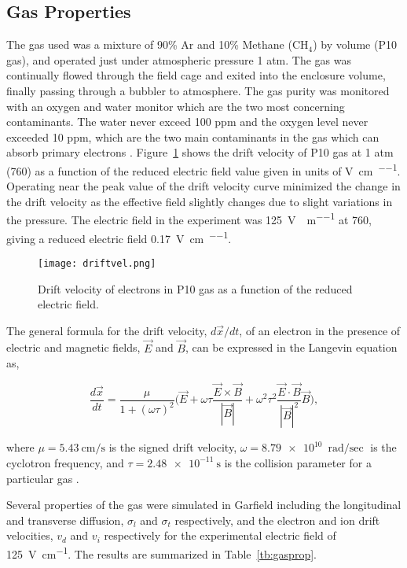 \subsection{Gas Properties}
The gas used was a mixture of 90\% Ar and 10\% Methane ($\mathrm{CH_4}$) by volume (P10 gas), and operated just under atmospheric pressure 1 atm. The gas was continually flowed through the field cage and exited into the enclosure volume, finally passing through a bubbler to atmosphere. The gas purity was monitored with an oxygen and water monitor which are the two most concerning contaminants. The water never exceed  100 ppm  and the oxygen level never exceeded 10 ppm, which are the two main contaminants in the gas which can absorb primary electrons \cite{tpcAging}. Figure~\ref{fig:driftvel} shows the drift velocity of P10 gas at 1 atm (\SI{760}{\torr}) as a function of the reduced electric field value given in units of \si{\volt\per\centi\metre\per\torr}. Operating near the peak value of the drift velocity curve minimized the change in the drift velocity as the effective field slightly changes due to slight variations in the pressure. The electric field in the experiment was \SI{125}{\volt\per\centi\per\metre} at \SI{760}{\torr}, giving a reduced electric field \SI{0.17}{\volt\per\centi\metre\per\torr}.

\begin{figure}[H]
\texttt{[image: driftvel.png]}
\caption{Drift velocity of electrons in P10 gas as a function of the reduced electric field.}
\label{fig:driftvel}
\end{figure}

The general formula for the drift velocity, $d\vec{x}/dt$, of an electron in the presence of electric and magnetic fields, $\vec{E}$ and $\vec{B}$, can be expressed in the Langevin equation as,  

\begin{equation}
\frac{d\vec{x}}{dt} = \frac{\mu}{1+(\omega\tau)^2}\Big(\vec{E} + \omega\tau\frac{\vec{E}\times\vec{B}}{|\vec{B}|}+\omega^2\tau^2\frac{\vec{E}\cdot\vec{B}}{|\vec{B}|^2}\vec{B}\Big),
\label{eq:elecdrift}
\end{equation}

where $\mu=\SI{5.43}{\centi\metre\per\second}$ is the signed drift velocity, $\omega=\SI{8.79e10}{\radian\per\sec}$ is the cyclotron frequency, and $\tau=\SI{2.48e-11}{\second}$ is the collision parameter for a particular gas \cite{blumrol}.

Several properties of the gas were simulated in Garfield including the longitudinal and transverse diffusion, $\sigma_l$ and $\sigma_t$ respectively, and the electron and ion drift velocities, $v_d$ and $v_i$ respectively for the experimental electric field of \SI{125}{\volt\per\centi\metre}. The results are summarized in Table~\ref{tb:gasprop}.


